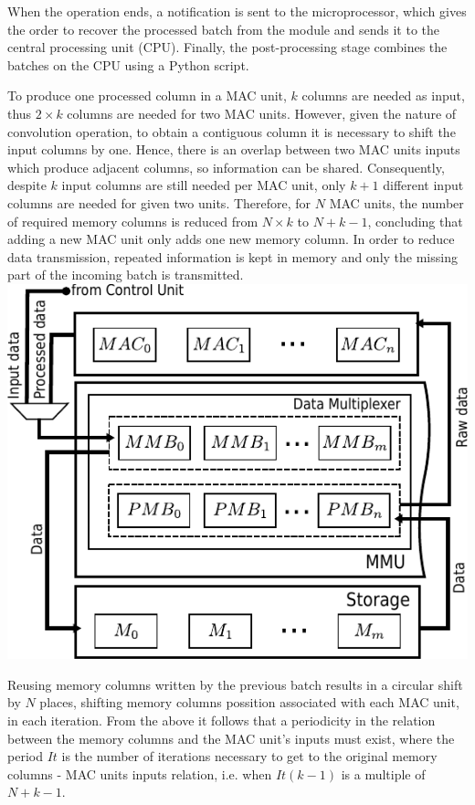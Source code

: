 \documentclass[a1paper,portrait,fontscale=0.43]{baposter}
\begin{document}
\begin{poster}
{When the operation ends, a notification is sent to the microprocessor,
which gives the order to recover the processed batch from the module and sends it
to the central processing unit (CPU). Finally, the post-processing stage combines
the batches on the CPU using a Python script.

\begin{multicols}{2}
To produce one processed column in a MAC unit, $k$ columns are needed as input,
thus $2 \times k$ columns are needed for two MAC units. 
However, given the nature of convolution operation, to obtain a contiguous
column it is necessary to shift the input columns by one. Hence, there is an
overlap between two MAC units inputs which produce adjacent columns, so information can
be shared.
Consequently, despite $k$ input columns are still needed per MAC unit, only $k+1$
different input columns are needed for given two units. 
Therefore, for $N$ MAC units, the number of required memory columns is reduced from $N \times k$ to $N+k-1$, concluding
that adding a new MAC unit only adds one new memory column.
In order to reduce data transmission, repeated
information is kept in memory and only the missing part of 
the incoming batch is transmitted.
\vfill\null
\columnbreak
\hfill \break
\includegraphics[width=\linewidth]{muxes}
\end{multicols}
\vspace{-0.43cm}
Reusing memory columns written by the previous batch results in
a circular shift by $N$ places, shifting memory columns possition associated with each
MAC unit, in each iteration.
From the above it
follows that a periodicity in the relation
between the memory columns and the
MAC unit's inputs must exist, where the period $It$ is the number of
iterations necessary to get to the original memory columns - MAC units
inputs relation, i.e. when $It(k-1)$ is a multiple of $N+k-1$. 

}
\end{poster}
\end{document}
